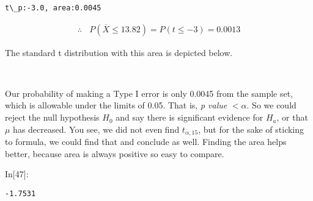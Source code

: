 \documentclass[float=false,crop=false]{standalone}
\begin{document}
    \begin{Verbatim}[commandchars=\\\{\},fontsize=\footnotesize]
t\_p:-3.0, area:0.0045

    \end{Verbatim}

    \begin{equation}
    \begin{aligned}
        \therefore \ \ \ \ P(\overline{X} \leq 13.82) = P(t \leq -3) = 0.0013
    \end{aligned}
\end{equation}

    The standard t distribution with this area is depicted below.
    \begin{center}
    \end{center}
    { \hspace*{\fill} \\}
    
    Our probability of making a Type I error is only 0.0045 from the sample
set, which is allowable under the limits of 0.05. That is, \emph{p
value} \(< \alpha\). So we could reject the null hypothesis \(H_0\) and
say there is significant evidence for \(H_a\), or that \(\mu\) has
decreased. You see, we did not even find \(t_{\alpha,15}\), but for the
sake of sticking to formula, we could find that and conclude as well.
Finding the area helps better, because area is always positive so easy
to compare.
\begin{InVerbatim}[commandchars=\\\{\},fontsize=\scriptsize]
{\color{incolor}In[{\color{incolor}47}]:}    
                
                
                   
                    
         
\end{InVerbatim}
    \begin{Verbatim}[commandchars=\\\{\},fontsize=\footnotesize]
-1.7531

    \end{Verbatim}
\end{document}
